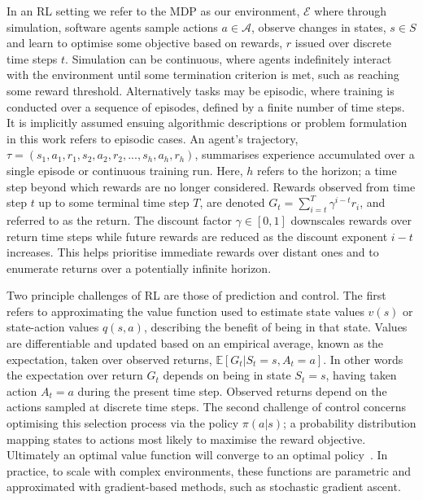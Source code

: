 \documentclass[runningheads]{llncs}
\begin{document}

In an RL setting we refer to the MDP as our environment, $\mathcal{E}$ where through simulation, software agents sample actions $a \in \mathcal{A}$, observe changes in states, $s \in S$ and learn to optimise some objective based on rewards, $r$ issued over discrete time steps $t$. Simulation can be continuous, where agents indefinitely interact with the environment until some termination criterion is met, such as reaching some reward threshold. Alternatively tasks may be episodic, where training is conducted over a sequence of episodes, defined by a finite number of time steps. It is implicitly assumed ensuing algorithmic descriptions or problem formulation in this work refers to episodic cases. An agent's trajectory, $\tau = (s_1, a_1, r_1,  s_2, a_2, r_2,...,s_h, a_h, r_h)$, summarises experience accumulated over a single episode or continuous training run. Here, $h$ refers to the horizon; a time step beyond which rewards are no longer considered. Rewards observed from time step $t$ up to some terminal time step $T$, are denoted $G_{t} = \sum_{i=t}^{T}\gamma^{i-t}r_{i}$, and referred to as the return. The discount factor $\gamma \in [0,1]$ downscales rewards over return time steps while future rewards are reduced as the discount exponent $i-t$ increases. This helps prioritise immediate rewards over distant ones and to enumerate returns over a potentially infinite horizon. 

Two principle challenges of RL are those of prediction and control. The first refers to approximating the value function used to estimate state values $v(s)$ or state-action values $q(s,a)$, describing the benefit of being in that state. Values are differentiable and updated based on an empirical average, known as the expectation, taken over observed returns, $\mathbb{E}[G_t | S_t = s, A_t = a]$. In other words the expectation over return $G_t$ depends on being in state $S_t = s$, having taken action $A_t = a$ during the present time step. Observed returns depend on the actions sampled at discrete time steps. The second challenge of control concerns optimising this selection process via the policy $\pi(a|s)$; a probability distribution mapping states to actions most likely to maximise the reward objective. Ultimately an optimal value function will converge to an optimal policy~\cite{melo2008analysis}. In practice, to scale with complex environments, these functions are parametric and approximated with gradient-based methods, such as stochastic gradient ascent.
\end{document}
